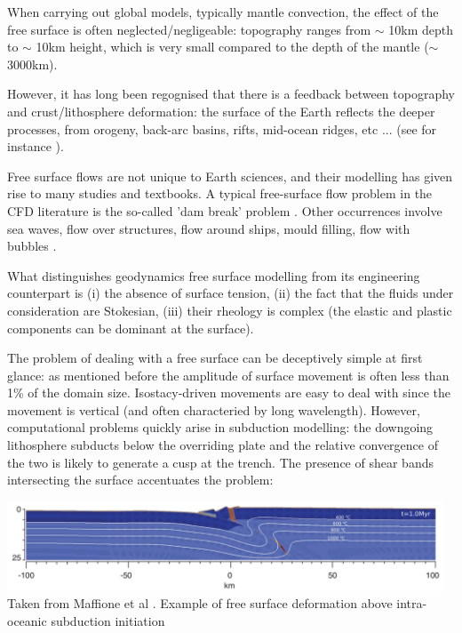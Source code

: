 

When carrying out global models, typically  mantle convection, the effect of the free surface
is often neglected/negligeable: topography ranges from $\sim$ 10km depth to $\sim$ 10km height, which 
is very small compared to the depth of the mantle ($\sim$ 3000km). 

However, it has long been regognised that there is a feedback between topography and crust/lithosphere
deformation: the surface of the Earth reflects the deeper processes, from orogeny, back-arc basins, 
rifts, mid-ocean ridges, etc ... (see for instance \cite{brau10b}).

\begin{remark}
Free surface flows are not unique to Earth sciences, and their modelling has given rise to many studies 
and textbooks. A typical free-surface flow problem in the CFD literature is the so-called 'dam break' 
problem \cite{moeb99,bacp07,liir07,lemx08,homa09,anco09}. Other occurrences involve 
sea waves, flow over structures, flow around ships, mould filling, flow with bubbles \cite{liir07}.
\end{remark}
 
What distinguishes geodynamics free surface modelling from its engineering 
counterpart is (i) the absence of surface tension, (ii) the fact that the fluids under consideration are
Stokesian, (iii) their rheology is complex (the elastic and plastic components can be 
dominant at the surface).


The problem of dealing with a free surface can be deceptively simple at first glance: as mentioned before the
amplitude of surface movement is often less than 1\% of the domain size. Isostacy-driven movements are
easy to deal with since the movement is vertical (and often characteried by  long wavelength). However, computational 
problems quickly arise in subduction modelling: the downgoing lithosphere subducts below the 
overriding plate and the relative convergence of the two is likely to generate a cusp at the trench. The presence
of shear bands intersecting the surface accentuates the problem:

\begin{center}
\includegraphics[width=13cm]{images/freesurface/matv15} \\
{\tiny Taken from Maffione et al \cite{matv15}. Example of free surface deformation above 
intra-oceanic subduction initiation}
\end{center}


